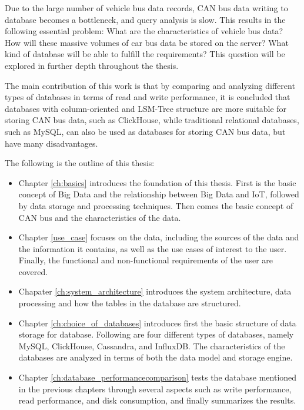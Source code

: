 Due to the large number of vehicle bus data records, CAN bus data writing to database becomes a bottleneck, and query analysis is slow. This results in the following essential problem: What are the characteristics of vehicle bus data? How will these massive volumes of car bus data be stored on the server? What kind of database will be able to fulfill the requirements? This question will be explored in further depth throughout the thesis.

The main contribution of this work is that by comparing and analyzing different types of databases in terms of read and write performance, it is concluded that databases with column-oriented and LSM-Tree structure are more suitable for storing CAN bus data, such as ClickHouse, while traditional relational databases, such as MySQL, can also be used as databases for storing CAN bus data, but have many disadvantages.

The following is the outline of this thesis:

\begin{itemize}
    \item Chapter \ref{ch:basics} introduces the foundation of this thesis. First is the basic concept of Big Data and the relationship between Big Data and IoT, followed by data storage and processing techniques. Then comes the basic concept of CAN bus and the characteristics of the data.
    
    \item Chapter \ref{use_case} focuses on the data, including the sources of the data and the information it contains, as well as the use cases of interest to the user. Finally, the functional and non-functional requirements of the user are covered.
    
    \item Chapater \ref{ch:system_architecture} introduces the system architecture, data processing and how the tables in the database are structured.
    
    \item Chapter \ref{ch:choice_of_databases} introduces first the basic structure of data storage for database. Following are four different types of databases, namely MySQL, ClickHouse, Cassandra, and InfluxDB. The characteristics of the databases are analyzed in terms of both the data model and storage engine.
    
    \item Chapter \ref{ch:database_performancecomparison} tests the database mentioned in the previous chapters through several aspects such as write performance, read performance, and disk consumption, and finally summarizes the results.
\end{itemize}

